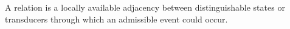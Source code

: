 \setcounter{theorem}{0}
\begin{definition}[Relation]
A relation is a locally available adjacency between distinguishable states or transducers through which an admissible event could occur.
\end{definition}
